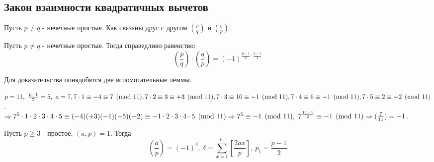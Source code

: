    \subsection*{Закон взаимности квадратичных вычетов}
    Пусть $p\ne q$ - нечетные простые. Как связаны друг с другом $(\frac{p}{q})$ и $(\frac{q}{p})$.
    \begin{theorem} \label{th10.5} 
        Пусть $p\ne q$ - нечетные простые. Тогда справедливо равенство:
        \[(\frac{p}{q})\cdot (\frac{q}{p})=(-1)^{\frac{p-1}{2}\cdot \frac{q-1}{2}}\]
    \end{theorem} 
    Для доказательства понядобятся две вспомогательные леммы. 
    \begin{example}
        $p=11,\ \frac{p-1}{2}=5,\ a=7,\\ 7\cdot 1\equiv -4 \equiv 7\pmod{11},\\ 7\cdot 2\equiv 3\equiv +3\pmod{11},\\ 7\cdot 3\equiv 10 \equiv -1\pmod{11},\\ 7\cdot 4\equiv 6\equiv -1 \pmod{11},\\ 7\cdot 5 \equiv 2 \equiv +2 \pmod{11}$.\\
        $\Rightarrow 7^5\cdot 1\cdot 2\cdot 3\cdot 4\cdot 5\equiv (-4)(+3)(-1)(-5)(+2)\equiv -1\cdot 2\cdot 3\cdot 4\cdot 5\pmod{11}\\
        \Rightarrow 7^5\equiv -1\pmod{11},\ 7^{\frac{11-1}{2}}\equiv -1\pmod{11}\Rightarrow (\frac{7}{11})=-1$.
    \end{example}
    \begin{lemma}\label{lemma10.1}
        Пусть $p\geq 3$ - простое, $(a,p)=1$. Тогда
        \[(\frac{a}{p})=(-1)^{\delta},\ \delta=\sum\limits_{x=1}^{p_1}[\frac{2ax}{p}],\ p_1=\frac{p-1}{2}\]
    \end{lemma} 
